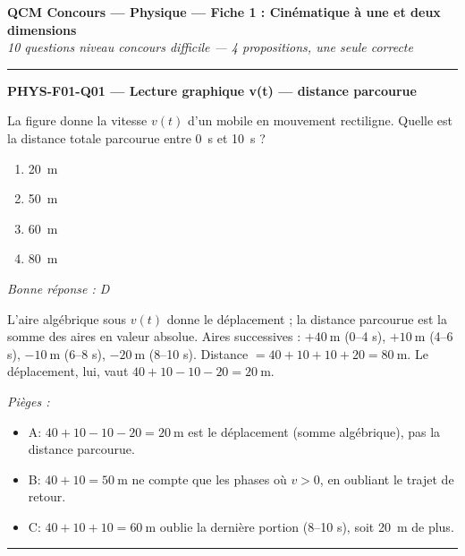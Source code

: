 \documentclass[11pt,a4paper]{article}
\begin{document}
\begin{center}
{\large\bfseries QCM Concours --- Physique --- Fiche 1 : Cinématique à une et deux dimensions}\\[2pt]
{\itshape 10 questions niveau concours difficile --- 4 propositions, une seule correcte}
\end{center}
\vspace{6pt}\hrule\vspace{10pt}

\noindent\textbf{PHYS-F01-Q01 --- Lecture graphique v(t) --- distance parcourue}\par
La figure donne la vitesse $v(t)$ d'un mobile en mouvement rectiligne. Quelle est la distance totale parcourue entre \qty{0}{\second} et \qty{10}{\second} ?
\begin{center}
\end{center}
\begin{enumerate}[label=\Alph*)]
\item \qty{20}{\metre}
\item \qty{50}{\metre}
\item \qty{60}{\metre}
\item \qty{80}{\metre}
\end{enumerate}
\textit{Bonne réponse : D}\par
L'aire algébrique sous $v(t)$ donne le déplacement ; la distance parcourue est la somme des aires en valeur absolue. Aires successives : $+\qty{40}{\metre}$ (0--4 s), $+\qty{10}{\metre}$ (4--6 s), $-\qty{10}{\metre}$ (6--8 s), $-\qty{20}{\metre}$ (8--10 s). Distance $=40+10+10+20=\qty{80}{\metre}$. Le déplacement, lui, vaut $40+10-10-20=\qty{20}{\metre}$.\par
\textit{Pièges :}
\begin{itemize}
\item A: $40+10-10-20=\qty{20}{\metre}$ est le déplacement (somme algébrique), pas la distance parcourue.
\item B: $40+10=\qty{50}{\metre}$ ne compte que les phases où $v>0$, en oubliant le trajet de retour.
\item C: $40+10+10=\qty{60}{\metre}$ oublie la dernière portion (8--10 s), soit \qty{20}{\metre} de plus.
\end{itemize}
\vspace{8pt}\hrule\vspace{8pt}
\end{document}
